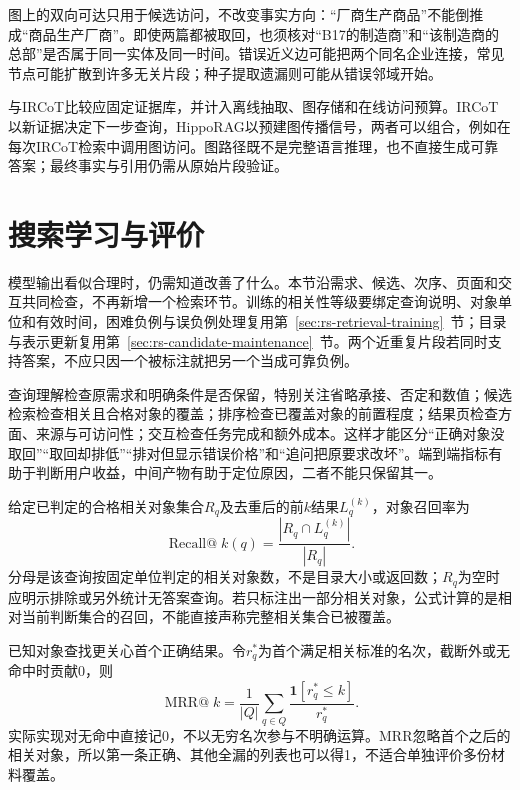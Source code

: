 图上的双向可达只用于候选访问，不改变事实方向：“厂商生产商品”不能倒推成“商品生产厂商”。即使两篇都被取回，也须核对“B17的制造商”和“该制造商的总部”是否属于同一实体及同一时间。错误近义边可能把两个同名企业连接，常见节点可能扩散到许多无关片段；种子提取遗漏则可能从错误邻域开始。

与IRCoT比较应固定证据库，并计入离线抽取、图存储和在线访问预算。IRCoT以新证据决定下一步查询，HippoRAG以预建图传播信号，两者可以组合，例如在每次IRCoT检索中调用图访问。图路径既不是完整语言推理，也不直接生成可靠答案；最终事实与引用仍需从原始片段验证。

\section{搜索学习与评价}
\label{sec:rs-search-evaluation}

模型输出看似合理时，仍需知道改善了什么。本节沿需求、候选、次序、页面和交互共同检查，不再新增一个检索环节。训练的相关性等级要绑定查询说明、对象单位和有效时间，困难负例与误负例处理复用第~\ref{sec:rs-retrieval-training}~节；目录与表示更新复用第~\ref{sec:rs-candidate-maintenance}~节。两个近重复片段若同时支持答案，不应只因一个被标注就把另一个当成可靠负例。

查询理解检查原需求和明确条件是否保留，特别关注省略承接、否定和数值；候选检索检查相关且合格对象的覆盖；排序检查已覆盖对象的前置程度；结果页检查方面、来源与可访问性；交互检查任务完成和额外成本。这样才能区分“正确对象没取回”“取回却排低”“排对但显示错误价格”和“追问把原要求改坏”。端到端指标有助于判断用户收益，中间产物有助于定位原因，二者不能只保留其一。

给定已判定的合格相关对象集合$R_q$及去重后的前$k$结果$L_q^{(k)}$，对象召回率为
\begin{equation}
 \operatorname{Recall@}k(q)
 =\frac{|R_q\cap L_q^{(k)}|}{|R_q|}.
 \label{eq:rs-search-recall}
\end{equation}
分母是该查询按固定单位判定的相关对象数，不是目录大小或返回数；$R_q$为空时应明示排除或另外统计无答案查询。若只标注出一部分相关对象，公式计算的是相对当前判断集合的召回，不能直接声称完整相关集合已被覆盖。

已知对象查找更关心首个正确结果。令$r_q^*$为首个满足相关标准的名次，截断外或无命中时贡献0，则
\begin{equation}
 \operatorname{MRR@}k=
 \frac1{|Q|}\sum_{q\in Q}
   \frac{\mathbf1[r_q^*\leq k]}{r_q^*}.
 \label{eq:rs-search-mrr}
\end{equation}
实际实现对无命中直接记0，不以无穷名次参与不明确运算。MRR忽略首个之后的相关对象，所以第一条正确、其他全漏的列表也可以得1，不适合单独评价多份材料覆盖。

